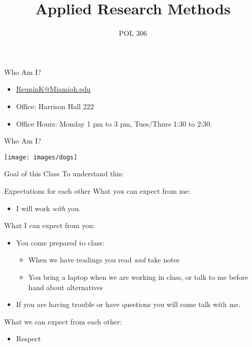 \documentclass[]{beamer}
\title{Applied Research Methods}
\author{POL 306}
\date{}
\begin{document}
\begin{frame}
	\maketitle
\end{frame}	


\begin{frame}{Who Am I?}
	\begin{itemize}
		\item \href{mailto:reunink@miamioh.edu}{ReuninK@Miamioh.edu}
		\item Office: Harrison Hall 222
		\item Office Hours: Monday 1 pm to 3 pm, Tues/Thurs 1:30 to 2:30. 
	\end{itemize}
\end{frame}

\begin{frame}{Who Am I?}

\centering 
\texttt{[image: images/dogs]}

\end{frame}

\begin{frame}{Goal of this Class}
To understand this: 

\end{frame}



\begin{frame}{Expectations for each other}
	What you can expect from me:
	\begin{itemize}
		\item I will work \textit{with} you. 
	\end{itemize} \pause
	What I can expect from you:
	\begin{itemize}
		\item You come prepared to class:
		\begin{itemize}
			\item When we have readings you read \textit{and} take notes
			\item You bring a laptop when we are working in class, or talk to me before hand about alternatives
		\end{itemize}
		\item If you are having trouble or have questions you will come talk with me. 
	\end{itemize} \pause 
	What we can expect from each other: 
	\begin{itemize}
			\item Respect
	\end{itemize}
\end{frame}
\end{document}
